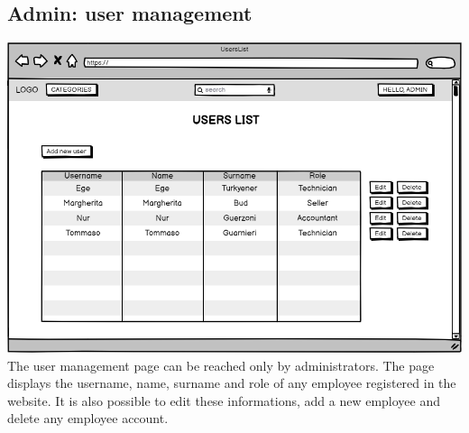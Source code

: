 \subsection{Admin: user management}
    \includegraphics[width=\textwidth,height=\textheight,keepaspectratio]{mockups/usersListPageMockup.png}
\\
    The user management page can be reached only by administrators. The page displays the username, name, surname and role of any employee registered in the website. It is also possible to edit these informations, add a new employee and delete any employee account.

